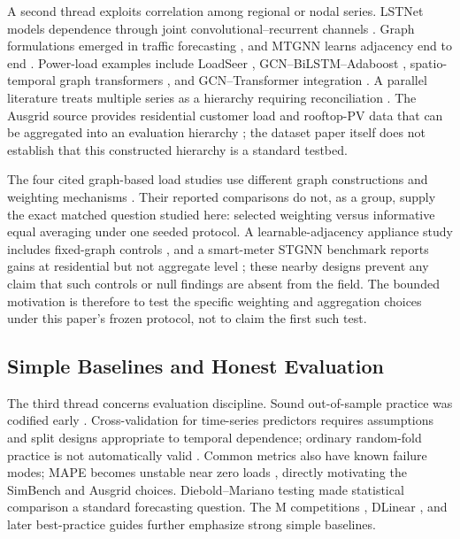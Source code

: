 \documentclass[electronics,article,submit,moreauthors]{Definitions/mdpi}
\begin{document}
A second thread exploits correlation among regional or nodal series. LSTNet models dependence through joint convolutional--recurrent channels \cite{ref19}. Graph formulations emerged in traffic forecasting \cite{ref20}, and MTGNN learns adjacency end to end \cite{ref21}. Power-load examples include LoadSeer \cite{ref4}, GCN--BiLSTM--Adaboost \cite{ref1}, spatio-temporal graph transformers \cite{ref2}, and GCN--Transformer integration \cite{ref3}. A parallel literature treats multiple series as a hierarchy requiring reconciliation \cite{ref22,ref23}. The Ausgrid source provides residential customer load and rooftop-PV data that can be aggregated into an evaluation hierarchy \cite{ref24}; the dataset paper itself does not establish that this constructed hierarchy is a standard testbed.

The four cited graph-based load studies use different graph constructions and weighting mechanisms \cite{ref1,ref2,ref3,ref4}. Their reported comparisons do not, as a group, supply the exact matched question studied here: selected weighting versus informative equal averaging under one seeded protocol. A learnable-adjacency appliance study includes fixed-graph controls \cite{ref31}, and a smart-meter STGNN benchmark reports gains at residential but not aggregate level \cite{ref32}; these nearby designs prevent any claim that such controls or null findings are absent from the field. The bounded motivation is therefore to test the specific weighting and aggregation choices under this paper's frozen protocol, not to claim the first such test.

\subsection{Simple Baselines and Honest Evaluation}\label{simple-baselines-and-honest-evaluation}

The third thread concerns evaluation discipline. Sound out-of-sample practice was codified early \cite{ref25}. Cross-validation for time-series predictors requires assumptions and split designs appropriate to temporal dependence; ordinary random-fold practice is not automatically valid \cite{ref26}. Common metrics also have known failure modes; MAPE becomes unstable near zero loads \cite{ref27}, directly motivating the SimBench and Ausgrid choices. Diebold--Mariano testing \cite{ref28} made statistical comparison a standard forecasting question. The M competitions \cite{ref6,ref7}, DLinear \cite{ref5}, and later best-practice guides \cite{ref8} further emphasize strong simple baselines.
\end{document}
